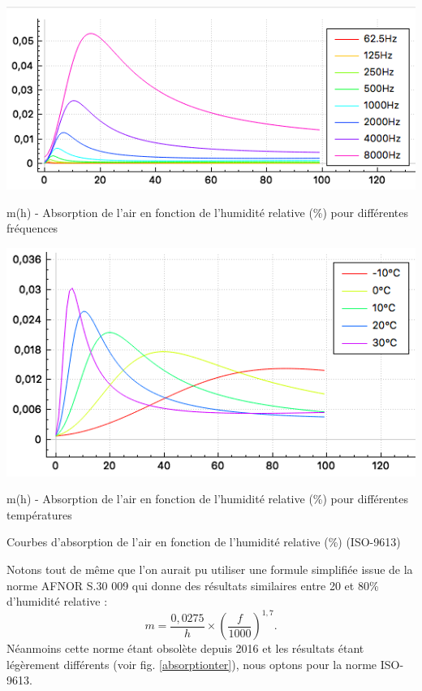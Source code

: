 \begin{figureth}
	\begin{subfigureth}{0.8\linewidth}
		\includegraphics[width=\linewidth]{images/absorption}
		\caption{m(h) - Absorption de l'air en fonction de l'humidité relative (\%) pour différentes fréquences}
		\label{absorption}
	\end{subfigureth}
	\begin{subfigureth}{0.8\linewidth}
		\includegraphics[width=\linewidth]{images/absorptionbis}
		\caption{m(h) - Absorption de l'air en fonction de l'humidité relative (\%) pour différentes températures}
		\label{absorptionbis}
	\end{subfigureth}
	\caption{Courbes d'absorption de l'air en fonction de l'humidité relative (\%) (ISO-9613) }
\end{figureth}

Notons tout de même que l'on aurait pu utiliser une formule simplifiée issue de la norme AFNOR S.30 009 qui donne des résultats similaires entre 20 et 80\% d'humidité relative \cite[p. 68-70]{jouhaneau} :
\begin{equation} \label{afnor}
	m = \frac{0,0275}{h} \times (\frac{f}{1000})^{1,7}.
\end{equation}
Néanmoins cette norme étant obsolète depuis 2016 et les résultats étant légèrement différents (voir fig. \ref{absorptionter}), nous optons pour la norme ISO-9613. \\

